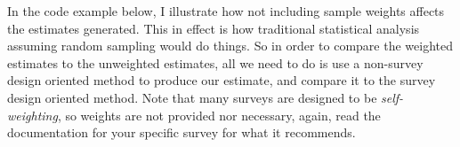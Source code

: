 \documentclass[
  letterpaper,
  DIV=11,
  numbers=noendperiod]{scrreprt}
\newenvironment{Shaded}{\begin{snugshade}}{\end{snugshade}}
\newcommand{\AttributeTok}[1]{\textcolor[rgb]{0.40,0.45,0.13}{#1}}
\newcommand{\CommentTok}[1]{\textcolor[rgb]{0.37,0.37,0.37}{#1}}
\newcommand{\DecValTok}[1]{\textcolor[rgb]{0.68,0.00,0.00}{#1}}
\newcommand{\FunctionTok}[1]{\textcolor[rgb]{0.28,0.35,0.67}{#1}}
\newcommand{\NormalTok}[1]{\textcolor[rgb]{0.00,0.23,0.31}{#1}}
\newcommand{\OtherTok}[1]{\textcolor[rgb]{0.00,0.23,0.31}{#1}}
\newcommand{\SpecialCharTok}[1]{\textcolor[rgb]{0.37,0.37,0.37}{#1}}
\newcommand{\StringTok}[1]{\textcolor[rgb]{0.13,0.47,0.30}{#1}}
\begin{document}
In the code example below, I illustrate how not including sample weights
affects the estimates generated. This in effect is how traditional
statistical analysis assuming random sampling would do things. So in
order to compare the weighted estimates to the unweighted estimates, all
we need to do is use a non-survey design oriented method to produce our
estimate, and compare it to the survey design oriented method. Note that
many surveys are designed to be \emph{self-weighting}, so weights are
not provided nor necessary, again, read the documentation for your
specific survey for what it recommends.

\begin{Shaded}
\end{Shaded}
\end{document}
